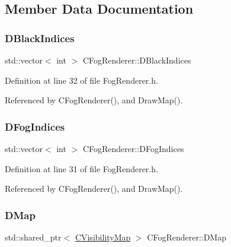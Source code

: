 \subsection{Member Data Documentation}
\hypertarget{classCFogRenderer_a09e3b546abbe52cc9addd1edfcc5ea9c}{}\label{classCFogRenderer_a09e3b546abbe52cc9addd1edfcc5ea9c} 
\subsubsection{\texorpdfstring{D\+Black\+Indices}{DBlackIndices}}
{\footnotesize\ttfamily std\+::vector$<$ int $>$ C\+Fog\+Renderer\+::\+D\+Black\+Indices\hspace{0.3cm}{\ttfamily [protected]}}



Definition at line 32 of file Fog\+Renderer.\+h.



Referenced by C\+Fog\+Renderer(), and Draw\+Map().

\hypertarget{classCFogRenderer_a2028e4642e756016819aab6567800af5}{}\label{classCFogRenderer_a2028e4642e756016819aab6567800af5} 
\subsubsection{\texorpdfstring{D\+Fog\+Indices}{DFogIndices}}
{\footnotesize\ttfamily std\+::vector$<$ int $>$ C\+Fog\+Renderer\+::\+D\+Fog\+Indices\hspace{0.3cm}{\ttfamily [protected]}}



Definition at line 31 of file Fog\+Renderer.\+h.



Referenced by C\+Fog\+Renderer(), and Draw\+Map().

\hypertarget{classCFogRenderer_a06be3616da23b5fce8ab3407b81788a4}{}\label{classCFogRenderer_a06be3616da23b5fce8ab3407b81788a4} 
\subsubsection{\texorpdfstring{D\+Map}{DMap}}
{\footnotesize\ttfamily std\+::shared\+\_\+ptr$<$ \hyperlink{classCVisibilityMap}{C\+Visibility\+Map} $>$ C\+Fog\+Renderer\+::\+D\+Map\hspace{0.3cm}{\ttfamily [protected]}}



